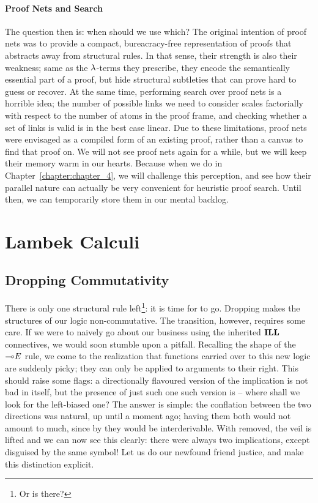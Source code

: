 \paragraph{Proof Nets and Search}
The question then is: when should we use which?
The original intention of proof nets was to provide a compact, bureacracy-free representation of proofs that abstracts away from structural rules.
In that sense, their strength is also their weakness; same as the $\mathnormal{\lambda}$-terms they prescribe, they encode the semantically essential part of a proof, but hide structural subtleties that can prove hard to guess or recover.
At the same time, performing search over proof nets is a horrible idea; the number of possible links we need to consider scales factorially with respect to the number of atoms in the proof frame, and checking whether a set of links is valid is in the best case linear.
Due to these limitations, proof nets were envisaged as a compiled form of an existing proof, rather than a canvas to find that proof on.
We will not see proof nets again for a while, but we will keep their memory warm in our hearts.
Because when we do in Chapter~\ref{chapter:chapter_4}, we will challenge this perception, and see how their parallel nature can actually be very convenient for heuristic proof search.
Until then, we can temporarily store them in our mental backlog. 


\section{Lambek Calculi}\label{section:lambek_calculi}
\subsection{Dropping Commutativity}
There is only one structural rule left\footnote{Or is there?}: it is time for \Exchange{} to go.
Dropping \Exchange{} makes the structures of our logic non-commutative.
The transition, however, requires some care.
If we were to naively go about our business using the inherited $\textbf{ILL}$ connectives, we would soon stumble upon a pitfall.
Recalling the shape of the $\li E$ rule, we come to the realization that functions carried over to this new logic are suddenly picky; they can only be applied to arguments to their right.
This should raise some flags: a directionally flavoured version of the implication is not bad in itself, but the presence of just such one such version is --  where shall we look for the left-biased one?
The answer is simple: the conflation between the two directions was natural, up until a moment ago; having them both would not amount to much, since by \Exchange{} they would be interderivable.
With \Exchange{} removed, the veil is lifted and we can now see this clearly: there were always two implications, except disguised by the same symbol!
Let us do our newfound friend justice, and make this distinction explicit.

